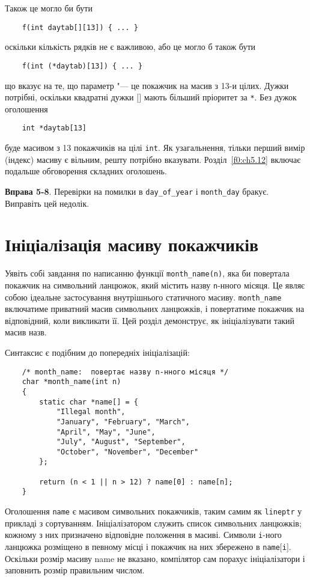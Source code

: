 \documentclass[a4paper,12pt]{book}
\begin{document}
  Також це могло би бути
  \begin{verbatim}
    f(int daytab[][13]) { ... }
  \end{verbatim}
  оскільки кількість рядків не є важливою, або це могло б також бути
  \begin{verbatim}
    f(int (*daytab)[13]) { ... }
  \end{verbatim}
  що вказує на те, що параметр "--- це покажчик на масив з 13-и цілих. Дужки потрібні,
  оскільки квадратні дужки \texttt{\mbox{$[$}\mbox{$]$}} мають більший пріоритет за
  \texttt{*}. Без дужок оголошення
  \begin{verbatim}
    int *daytab[13]
  \end{verbatim}
  буде масивом з 13 покажчиків на цілі
  \texttt{int}. Як узагальнення, тільки перший вимір (індекс) масиву є вільним, решту
  потрібно вказувати.
  Розділ~\ref{f0:ch5.12} включає подальше обговорення складних оголошень.

  \textbf{Вправа 5-8}. Перевірки на помилки в \texttt{day\_of\_year} і \texttt{month\_day}
  бракує. Виправіть цей недолік.

\section{Ініціалізація масиву покажчиків}


  Уявіть собі завдання по написанню функції \texttt{month\_name(n)}, яка би повертала
  покажчик на символьний ланцюжок, який містить назву \texttt{n}-нного місяця. Це являє
  собою ідеальне застосування внутрішнього статичного масиву. \texttt{month\_name} включатиме
  приватний масив символьних ланцюжків, і повертатиме покажчик на відповідний, коли
  викликати її. Цей розділ демонструє, як ініціалізувати такий масив назв.

  Синтаксис є подібним до попередніх ініціалізацій:
  \begin{verbatim}
    /* month_name:  повертає назву n-нного місяця */
    char *month_name(int n)
    {
        static char *name[] = {
            "Illegal month",
            "January", "February", "March",
            "April", "May", "June",
            "July", "August", "September",
            "October", "November", "December"
        };

        return (n < 1 || n > 12) ? name[0] : name[n];
    }
  \end{verbatim}

  Оголошення \texttt{name} є масивом символьних покажчиків, таким самим як
  \texttt{lineptr} у прикладі з сортуванням. Ініціалізатором служить список символьних
  ланцюжків; кожному з них призначено відповідне положення в масиві. Символи
  \texttt{i}-ного ланцюжка розміщено в певному місці і покажчик на них збережено в
  \texttt{name\mbox{$[$}i\mbox{$]$}}. Оскільки розмір масиву name не вказано, компілятор сам порахує
  ініціалізатори і заповнить розмір правильним числом.
\end{document}
